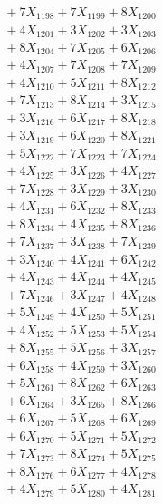 \documentclass[a4paper,10pt]{article}
\begin{document}
{\begin{align}
&\;  + 7 X_{1198} + 7 X_{1199} + 8 X_{1200} \\[0.3ex]
&\;  + 4 X_{1201} + 3 X_{1202} + 3 X_{1203} \\[0.3ex]
&\;  + 8 X_{1204} + 7 X_{1205} + 6 X_{1206} \\[0.3ex]
&\;  + 4 X_{1207} + 7 X_{1208} + 7 X_{1209} \\[0.5ex]\allowbreak
&\;  + 4 X_{1210} + 5 X_{1211} + 8 X_{1212} \\[0.3ex]
&\;  + 7 X_{1213} + 8 X_{1214} + 3 X_{1215} \\[0.3ex]
&\;  + 3 X_{1216} + 6 X_{1217} + 8 X_{1218} \\[0.3ex]
&\;  + 3 X_{1219} + 6 X_{1220} + 8 X_{1221} \\[0.3ex]
&\;  + 5 X_{1222} + 7 X_{1223} + 7 X_{1224} \\[0.3ex]
&\;  + 4 X_{1225} + 3 X_{1226} + 4 X_{1227} \\[0.3ex]
&\;  + 7 X_{1228} + 3 X_{1229} + 3 X_{1230} \\[0.3ex]
&\;  + 4 X_{1231} + 6 X_{1232} + 8 X_{1233} \\[0.3ex]
&\;  + 8 X_{1234} + 4 X_{1235} + 8 X_{1236} \\[0.3ex]
&\;  + 7 X_{1237} + 3 X_{1238} + 7 X_{1239} \\[0.5ex]\allowbreak
&\;  + 3 X_{1240} + 4 X_{1241} + 6 X_{1242} \\[0.3ex]
&\;  + 4 X_{1243} + 4 X_{1244} + 4 X_{1245} \\[0.3ex]
&\;  + 7 X_{1246} + 3 X_{1247} + 4 X_{1248} \\[0.3ex]
&\;  + 5 X_{1249} + 4 X_{1250} + 5 X_{1251} \\[0.3ex]
&\;  + 4 X_{1252} + 5 X_{1253} + 5 X_{1254} \\[0.3ex]
&\;  + 8 X_{1255} + 5 X_{1256} + 3 X_{1257} \\[0.3ex]
&\;  + 6 X_{1258} + 4 X_{1259} + 3 X_{1260} \\[0.3ex]
&\;  + 5 X_{1261} + 8 X_{1262} + 6 X_{1263} \\[0.3ex]
&\;  + 6 X_{1264} + 3 X_{1265} + 8 X_{1266} \\[0.3ex]
&\;  + 6 X_{1267} + 5 X_{1268} + 6 X_{1269} \\[0.5ex]\allowbreak
&\;  + 6 X_{1270} + 5 X_{1271} + 5 X_{1272} \\[0.3ex]
&\;  + 7 X_{1273} + 8 X_{1274} + 5 X_{1275} \\[0.3ex]
&\;  + 8 X_{1276} + 6 X_{1277} + 4 X_{1278} \\[0.3ex]
&\;  + 4 X_{1279} + 5 X_{1280} + 4 X_{1281} \\[0.3ex]

\end{align}}
\end{document}
